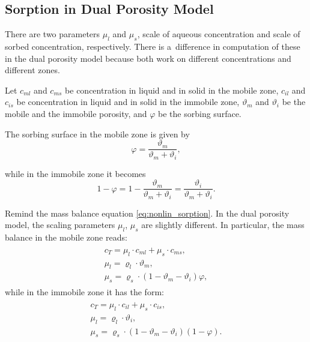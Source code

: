 \subsection{Sorption in Dual Porosity Model} 
\label{subsec:sorp_dual_por}
There are two parameters $\mu_l$ and $\mu_s$, scale of aqueous concentration and scale of sorbed concentration, respectively.  
There is a~difference in computation of these in the dual porosity model because both work on different concentrations
and different zones.

Let $c_{ml}$ and $c_{ms}$ be concentration in liquid and in solid in the mobile zone, 
$c_{il}$ and $c_{is}$ be concentration in liquid and in solid in the immobile zone,
$\vartheta_m$ and $\vartheta_i$ be the mobile and the immobile porosity,
and $\varphi$ be the sorbing surface.

The sorbing surface in the mobile zone is given by
\begin{equation}
  \varphi = \frac{\vartheta_m}{\vartheta_m + \vartheta_i}, 
\end{equation}

while in the immobile zone it becomes
\[ 1 - \varphi = 1-\frac{\vartheta_m}{\vartheta_m + \vartheta_i} = \frac{\vartheta_i}{\vartheta_m + \vartheta_i}. \]

Remind the mass balance equation \eqref{eq:nonlin_sorption}.
In the dual porosity model, the scaling parameters $\mu_l$, $\mu_s$ are slightly different.
In particular, the mass balance in the mobile zone reads:
\begin{eqnarray}
 \begin{array}{l}
  c_T = \mu_l\cdot c_{ml} + \mu_s\cdot c_{ms},\\
  \mu_l = \varrho_l \cdot \vartheta_m, \\
  \mu_s = \varrho_s\cdot(1-\vartheta_m - \vartheta_i)\varphi,
 \end{array}
 \label{eq:scale_params_m}
\end{eqnarray}
while in the immobile zone it has the form:
\begin{eqnarray}
 \begin{array}{l}
  c_T = \mu_l\cdot c_{il} + \mu_s\cdot c_{is},\\
  \mu_l = \varrho_l \cdot \vartheta_i, \\
  \mu_s = \varrho_s\cdot(1-\vartheta_m - \vartheta_i)(1 - \varphi).
 \end{array}
 \label{eq:scale_params_i}
\end{eqnarray}
